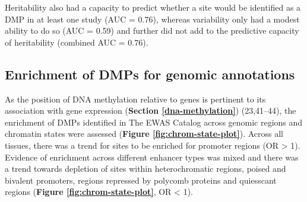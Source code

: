 \documentclass[11pt,oneside]{bristolthesis}
\begin{document}
Heritability also had a capacity to predict whether a site would be identified as a DMP in at least one study (AUC = 0.76), whereas variability only had a modest ability to do so (AUC = 0.59) and further did not add to the predictive capacity of heritability (combined AUC = 0.76).

\hypertarget{dmp-enrichment-results}{%
\subsection{Enrichment of DMPs for genomic annotations}\label{dmp-enrichment-results}}

As the position of DNA methylation relative to genes is pertinent to its association with gene expression (\textbf{Section \ref{dna-methylation}}) (23,41--44), the enrichment of DMPs identified in The EWAS Catalog across genomic regions and chromatin states were assessed (\textbf{Figure \ref{fig:chrom-state-plot}}). Across all tissues, there was a trend for sites to be enriched for promoter regions (OR \textgreater{} 1). Evidence of enrichment across different enhancer types was mixed and there was a trend towards depletion of sites within heterochromatic regions, poised and bivalent promoters, regions repressed by polycomb proteins and quiesscant regions (\textbf{Figure \ref{fig:chrom-state-plot}}, OR \textless{} 1).
\end{document}
